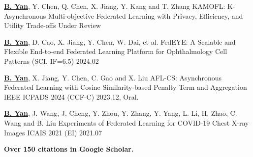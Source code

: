 

\begin{cventries}
\cventry
{\underline{\textbf{B. Yan}}, Y. Chen, Q. Chen, X. Jiang, Y. Kang and T. Zhang} %
{KAMOFL: K-Asynchronous Multi-objective Federated Learning with Privacy, Efficiency, and Utility Trade-offs} %
{Under Review} %
{} %
{
}

\cventry
{\underline{\textbf{B. Yan}}, D. Cao, X. Jiang, Y. Chen, W. Dai, et al.} %
{FedEYE: A Scalable and Flexible End-to-end Federated Learning Platform for Ophthalmology} %
{Cell Patterns (SCI, IF=6.5)} %
{2024.02} %
{
}

\cventry
{\underline{\textbf{B. Yan}}, X. Jiang, Y. Chen, C. Gao and X. Liu} %
{AFL-CS: Asynchronous Federated Learning with Cosine Similarity-based Penalty Term and Aggregation} %
{IEEE ICPADS 2024 (CCF-C)} %
{2023.12, Oral.} %
{
}

\cventry
{\underline{\textbf{B. Yan}}, J. Wang, J. Cheng, Y. Zhou, Y. Zhang, Y. Yang, L. Li, H. Zhao, C. Wang and B. Liu} %
{Experiments of Federated Learning for COVID-19 Chest X-ray Images} %
{ICAIS 2021 (EI)} %
{2021.07} %
{
	\begin{cvitems} %
		\item {\textcolor{awesome-red}{\textbf{Over 150 citations in Google Scholar.}}}
	\end{cvitems}
}


\end{cventries}
